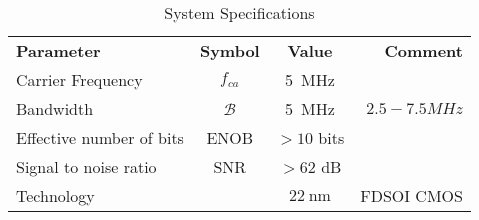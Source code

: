 
\begin{table}[htbp]
    \centering
    \caption{System Specifications}
      \begin{tabular}{lccr}
      \rowcolor[rgb]{ 0,  0,  0} \textcolor[rgb]{ 1,  1,  1}{\textbf{Parameter}}	 & \textcolor[rgb]{ 1,  1,  1}{\textbf{Symbol}}
                               & \textcolor[rgb]{ 1,  1,  1}{\textbf{Value}}       & \textcolor[rgb]{ 1,  1,  1}{\textbf{Comment}}    \\
      Carrier Frequency & $f_{ca}$ & \SI{5}{MHz} &                                                                                        \\
      Bandwidth & $\mathcal{B}$ & \SI{5}{MHz} & $2.5-7.5\si{MHz}$                                                                      \\
      Effective number of bits & ENOB & $>10$ bits &                                                                                    \\
      Signal to noise ratio & SNR & $>62$ dB &                                                                                           \\
      Technology & & $\SI{22}{\nano\metre}$ & FDSOI CMOS
      \end{tabular}
    \label{tab:adc_specs}
  \end{table}


